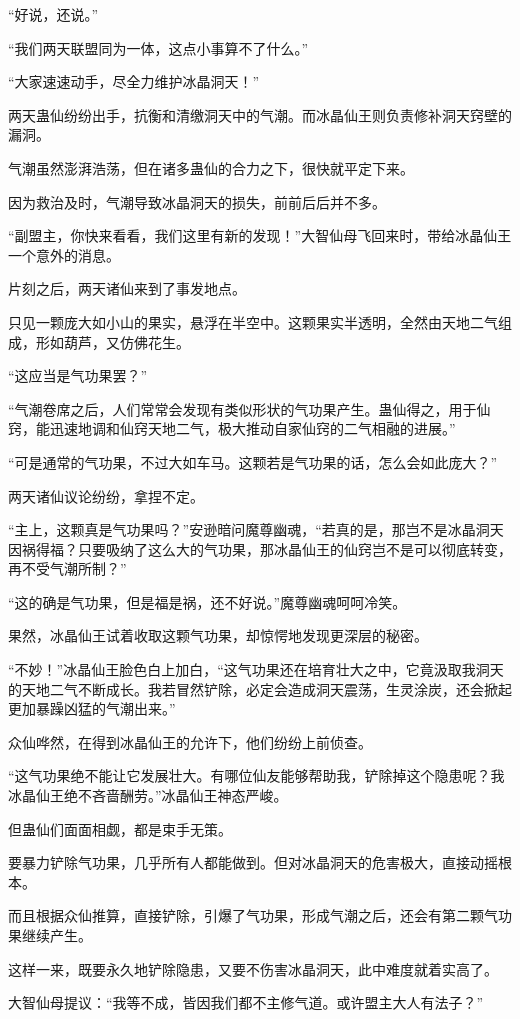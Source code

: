 \begin{this_body}
“好说，还说。”

“我们两天联盟同为一体，这点小事算不了什么。”

“大家速速动手，尽全力维护冰晶洞天！”

两天蛊仙纷纷出手，抗衡和清缴洞天中的气潮。而冰晶仙王则负责修补洞天窍壁的漏洞。

气潮虽然澎湃浩荡，但在诸多蛊仙的合力之下，很快就平定下来。

因为救治及时，气潮导致冰晶洞天的损失，前前后后并不多。

“副盟主，你快来看看，我们这里有新的发现！”大智仙母飞回来时，带给冰晶仙王一个意外的消息。

片刻之后，两天诸仙来到了事发地点。

只见一颗庞大如小山的果实，悬浮在半空中。这颗果实半透明，全然由天地二气组成，形如葫芦，又仿佛花生。

“这应当是气功果罢？”

“气潮卷席之后，人们常常会发现有类似形状的气功果产生。蛊仙得之，用于仙窍，能迅速地调和仙窍天地二气，极大推动自家仙窍的二气相融的进展。”

“可是通常的气功果，不过大如车马。这颗若是气功果的话，怎么会如此庞大？”

两天诸仙议论纷纷，拿捏不定。

“主上，这颗真是气功果吗？”安逊暗问魔尊幽魂，“若真的是，那岂不是冰晶洞天因祸得福？只要吸纳了这么大的气功果，那冰晶仙王的仙窍岂不是可以彻底转变，再不受气潮所制？”

“这的确是气功果，但是福是祸，还不好说。”魔尊幽魂呵呵冷笑。

果然，冰晶仙王试着收取这颗气功果，却惊愕地发现更深层的秘密。

“不妙！”冰晶仙王脸色白上加白，“这气功果还在培育壮大之中，它竟汲取我洞天的天地二气不断成长。我若冒然铲除，必定会造成洞天震荡，生灵涂炭，还会掀起更加暴躁凶猛的气潮出来。”

众仙哗然，在得到冰晶仙王的允许下，他们纷纷上前侦查。

“这气功果绝不能让它发展壮大。有哪位仙友能够帮助我，铲除掉这个隐患呢？我冰晶仙王绝不吝啬酬劳。”冰晶仙王神态严峻。

但蛊仙们面面相觑，都是束手无策。

要暴力铲除气功果，几乎所有人都能做到。但对冰晶洞天的危害极大，直接动摇根本。

而且根据众仙推算，直接铲除，引爆了气功果，形成气潮之后，还会有第二颗气功果继续产生。

这样一来，既要永久地铲除隐患，又要不伤害冰晶洞天，此中难度就着实高了。

大智仙母提议：“我等不成，皆因我们都不主修气道。或许盟主大人有法子？”


\end{this_body}
